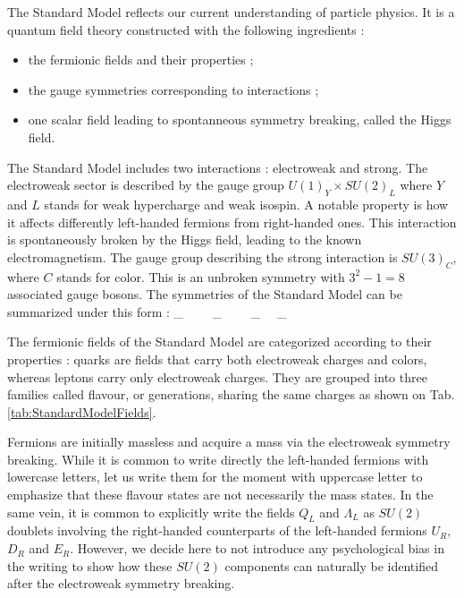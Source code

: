     The Standard Model reflects our current understanding of particle physics. It is
    a quantum field theory constructed with the following ingredients :
    \begin{itemize}
        \item the fermionic fields and their properties ;
        \item the gauge symmetries corresponding to interactions ;
        \item one scalar field leading to spontanneous symmetry breaking, called the
              Higgs field.
    \end{itemize}

    The Standard Model includes two interactions : electroweak and strong. The electroweak
    sector is described by the gauge group $U(1)_Y \times SU(2)_L$ where $Y$ and $L$
    stands for weak hypercharge and weak isospin. A notable property is how it affects
    differently left-handed fermions from right-handed ones. This interaction is
    spontaneously broken by the Higgs field, leading to the known electromagnetism.
    The gauge group describing the strong interaction is $SU(3)_C$, where $C$ stands for
    color. This is an unbroken symmetry with $3^2-1 = 8$ associated gauge bosons. The
    symmetries of the Standard Model can be summarized under this form :
    {
        _{}
        \,\,\,\,
        \times
        \,\,\,\,
        _{}
        \,\,\,\,
        \,\,\,\,
        _{}
        \,\,\,\,
        \times
        _{}
    }

    The fermionic fields of the Standard Model are categorized according to their
    properties : quarks are fields that carry both electroweak charges and colors, whereas
    leptons carry only electroweak charges. They are grouped into three families called
    flavour, or generations, sharing the same charges as shown on Tab.
    \ref{tab:StandardModelFields}.

    Fermions are initially massless and acquire a mass via
    the electroweak symmetry breaking. While it is common to write directly the left-handed
    fermions with lowercase letters, let us write them for the moment with uppercase letter
    to emphasize that these flavour states are not necessarily the mass states. In the same
    vein, it is common to explicitly write the fields $Q_L$ and $\Lambda_L$ as $SU(2)$ doublets
    involving the right-handed counterparts of the left-handed fermions $U_R$, $D_R$ and $E_R$.
    However, we decide here to not introduce any psychological bias in the writing to show
    how these $SU(2)$ components can naturally be identified after the electroweak symmetry breaking.

